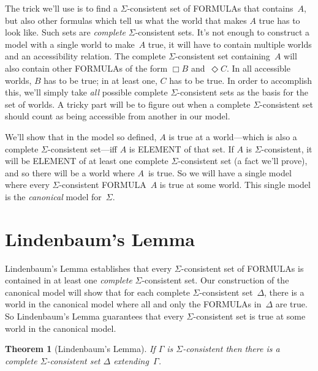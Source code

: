 \documentclass[10pt,a4paper]{article}
\newcommand*{\olup}[1]{\MakeUppercase{#1}}
\theoremstyle{plain}
\newtheorem{thm}{Theorem}[section]
\theoremstyle{definition}
\theoremstyle{remark}
\newcommand*{\olfileid}[3]{}
\newcommand*{\olsection}[1]{\section*{#1}}
\newcommand*{\ollabel}[1]{\label{#1}}
\begin{document}
The trick we'll use is to find a $\Sigma$-consistent set of
\olup{formula}s that contains~$A$, but also other formulas which tell us
what the world that makes $A$ true has to look like. Such sets are
\emph{complete} $\Sigma$-consistent sets. It's not enough to
construct a model with a single world to make~$A$ true, it will have
to contain multiple worlds and an accessibility relation. The complete
$\Sigma$-consistent set containing~$A$ will also contain other
\olup{formula}s of the form $\Box B$ and~$\Diamond C$. In all
accessible worlds, $B$ has to be true; in at least one, $C$ has to
be true. In order to accomplish this, we'll simply take \emph{all}
possible complete $\Sigma$-consistent sets as the basis for the set of
worlds. A tricky part will be to figure out when a complete
$\Sigma$-consistent set should count as being accessible from another
in our model.

We'll show that in the model so defined, $A$ is true at a
world---which is also a complete $\Sigma$-consistent set---iff $A$ is
\olup{element} of that set.  If $A$ is $\Sigma$-consistent, it will be
\olup{element} of at least one complete $\Sigma$-consistent set (a fact
we'll prove), and so there will be a world where $A$~is true. So we
will have a single model where every $\Sigma$-consistent
\olup{formula}~$A$ is true at some world.  This single model is the
\emph{canonical} model for~$\Sigma$.





\olfileid{nml}{com}{lin}

\olsection{Lindenbaum's Lemma}

Lindenbaum's Lemma establishes that every $\Sigma$-consistent set of
\olup{formula}s is contained in at least one \emph{complete}
$\Sigma$-consistent set. Our construction of the canonical model will
show that for each complete $\Sigma$-consistent set~$\Delta$, there is
a world in the canonical model where all and only the \olup{formula}s
in~$\Delta$ are true. So Lindenbaum's Lemma guarantees that every
$\Sigma$-consistent set is true at some world in the canonical model.

\begin{thm}[Lindenbaum's Lemma]\ollabel{thm:lindenbaum}
  If $\Gamma$ is $\Sigma$-consistent then there is a complete
  $\Sigma$-consistent set $\Delta$ extending~$\Gamma$.
\end{thm}
\end{document}
